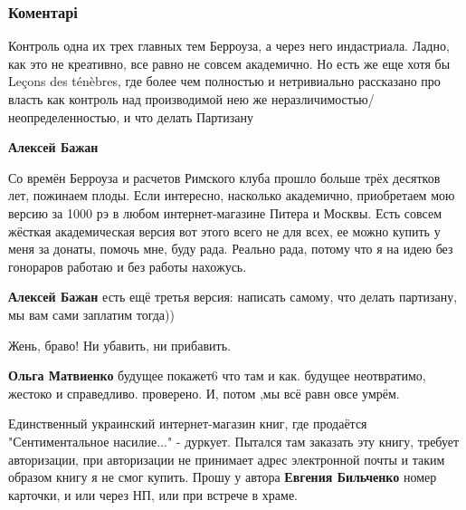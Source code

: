  
 
 
 
 
\subsubsection{Коментарі}
\label{sec:10_11_2021.fb.bilchenko_evgenia.1.kniga.cmt}

\begin{itemize} %

Контроль одна их трех главных тем Берроуза, а через него индастриала. Ладно,
как это не креативно, все равно не совсем академично. Но есть же еще хотя бы
Leçons des ténèbres, где более чем полностью и нетривиально рассказано про
власть как контроль над производимой нею же неразличимостью/неопределенностью,
и что делать Партизану

\begin{itemize} %
\textbf{Алексей Бажан} 

Со времён Берроуза и расчетов Римского клуба прошло больше трёх десятков лет,
пожинаем плоды. Если интересно, насколько академично, приобретаем мою версию за
1000 рэ в любом интернет-магазине Питера и Москвы. Есть совсем жёсткая
академическая версия вот этого всего не для всех, ее можно купить у меня за
донаты, помочь мне, буду рада. Реально рада, потому что я на идею без гонораров
работаю и без работы нахожусь.

\textbf{Алексей Бажан} есть ещё третья версия: написать самому, что делать партизану, мы вам сами заплатим тогда))
\end{itemize} %

Жень, браво! Ни убавить, ни прибавить.

\begin{itemize} %
\textbf{Ольга Матвиенко} будущее покажет6 что там и как. будущее неотвратимо, жестоко и справедливо. проверено. И, потом ,мы всё равн овсе умрём.
\end{itemize} %


Единственный украинский интернет-магазин книг, где продаётся "Сентиментальное
насилие..." - дуркует. Пытался там заказать эту книгу, требует авторизации, при
авторизации не принимает адрес электронной почты и таким образом книгу я не
смог купить. Прошу у автора \textbf{Евгения Бильченко} номер карточки, и или через НП,
или при встрече в храме.


\end{itemize}

